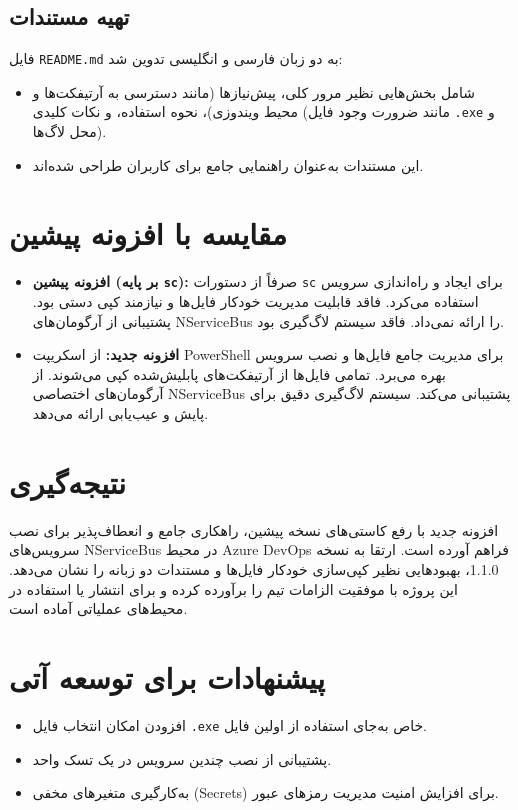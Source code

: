 \documentclass[a4paper,12pt]{article}
\begin{document}
\subsection*{تهیه مستندات}
فایل \texttt{README.md} به دو زبان فارسی و انگلیسی تدوین شد:
\begin{itemize}
    \item شامل بخش‌هایی نظیر مرور کلی، پیش‌نیازها (مانند دسترسی به آرتیفکت‌ها و محیط ویندوزی)، نحوه استفاده، و نکات کلیدی (مانند ضرورت وجود فایل \texttt{.exe} و محل لاگ‌ها).
    \item این مستندات به‌عنوان راهنمایی جامع برای کاربران طراحی شده‌اند.
\end{itemize}

\section*{مقایسه با افزونه پیشین}
\begin{itemize}
    \item \textbf{افزونه پیشین (بر پایه \texttt{sc}):}
    صرفاً از دستورات \texttt{sc} برای ایجاد و راه‌اندازی سرویس استفاده می‌کرد. فاقد قابلیت مدیریت خودکار فایل‌ها و نیازمند کپی دستی بود. پشتیبانی از آرگومان‌های NServiceBus را ارائه نمی‌داد. فاقد سیستم لاگ‌گیری بود.

    \item \textbf{افزونه جدید:}
    از اسکریپت PowerShell برای مدیریت جامع فایل‌ها و نصب سرویس بهره می‌برد. تمامی فایل‌ها از آرتیفکت‌های پابلیش‌شده کپی می‌شوند. از آرگومان‌های اختصاصی NServiceBus پشتیبانی می‌کند. سیستم لاگ‌گیری دقیق برای پایش و عیب‌یابی ارائه می‌دهد.
\end{itemize}

\section*{نتیجه‌گیری}
افزونه جدید با رفع کاستی‌های نسخه پیشین، راهکاری جامع و انعطاف‌پذیر برای نصب سرویس‌های NServiceBus در محیط Azure DevOps فراهم آورده است. ارتقا به نسخه 1.1.0، بهبودهایی نظیر کپی‌سازی خودکار فایل‌ها و مستندات دو زبانه را نشان می‌دهد. این پروژه با موفقیت الزامات تیم را برآورده کرده و برای انتشار یا استفاده در محیط‌های عملیاتی آماده است.

\section*{پیشنهادات برای توسعه آتی}
\begin{itemize}
    \item افزودن امکان انتخاب فایل \texttt{.exe} خاص به‌جای استفاده از اولین فایل.
    \item پشتیبانی از نصب چندین سرویس در یک تسک واحد.
    \item به‌کارگیری متغیرهای مخفی (Secrets) برای افزایش امنیت مدیریت رمزهای عبور.
\end{itemize}
\end{document}
